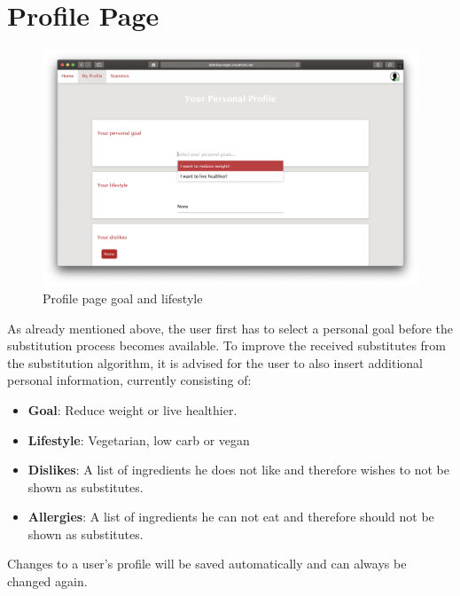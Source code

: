 \section*{Profile Page}

\vspace{-1em}
\begin{figure}[H]
	\captionsetup{justification=centering}
	\begin{center}
		\includegraphics[scale=0.25]{Ressourcen/img/screenshots/screenshotO.png}
		\vspace{-2em}
		\caption{Profile page goal and lifestyle}
	\end{center}
\end{figure}
\vspace{-3.5em}
As already mentioned above, the user first has to select a personal goal before the substitution process becomes available. To improve the received substitutes from the substitution algorithm, it is advised for the user to also insert additional personal information, currently consisting of:
\vspace{-3em}

\begin{itemize}
\item \textbf{Goal}: Reduce weight or live healthier.
\item \textbf{Lifestyle}: Vegetarian, low carb or vegan
\item \textbf{Dislikes}: A list of ingredients he does not like and therefore wishes to not be shown as substitutes.
\item \textbf{Allergies}: A list of ingredients he can not eat and therefore should not be shown as substitutes.
\end{itemize}
\vspace{-1em}
Changes to a user’s profile will be saved automatically and can always be changed again.
\vspace{-1em}

